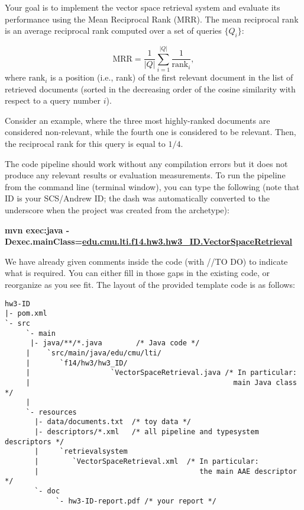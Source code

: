 \documentclass[oneside,11pt]{memoir}
\begin{document}
Your goal is to implement the vector space retrieval system
and evaluate its performance using the Mean Reciprocal Rank (MRR).  
The mean reciprocal rank is an average reciprocal rank
computed over a set of queries $\{Q_i\}$:

\begin{equation}\label{EqMRR}
\mbox{MRR} = \frac{1}{|Q|}\sum\limits_{i=1}^{|Q|} \frac{1} {\mbox{rank}_i},
\end{equation}
where $\mbox{rank}_i$ is a position (i.e., rank) of the first relevant document
in the list of retrieved documents (sorted in the decreasing order of the cosine similarity with respect to a query number $i$).

Consider an example, where the three most highly-ranked documents are considered 
non-relevant, while the fourth one is considered to be relevant. 
Then, the reciprocal rank for this query is equal to $1/4$.

The code pipeline should work without any compilation errors but it does not produce any relevant results or evaluation measurements.
To run the pipeline from the command line (terminal window), you can type the following
(note that ID is your SCS/Andrew ID; the dash was automatically converted to the underscore when the project was created from the archetype):

\begin{center}\small\textbf{mvn exec:java 
       -Dexec.mainClass=\url{edu.cmu.lti.f14.hw3.hw3_ID.VectorSpaceRetrieval}}\end{center}

We have already given comments inside the code (with //TO DO) to indicate what is required. 
You can either fill in those gaps in the existing code, or reorganize as you see fit.
The layout of the provided template code is as follows:

\hspace{-3em}
\begin{minipage}{0.9\textwidth}
\footnotesize
\begin{verbatim}
hw3-ID
|- pom.xml
`- src
     `- main
      |- java/**/*.java        /* Java code */
     |    `src/main/java/edu/cmu/lti/
     |       `f14/hw3/hw3_ID/
     |                   `VectorSpaceRetrieval.java /* In particular:
     |                                                main Java class */
     |                           
     `- resources
       |- data/documents.txt  /* toy data */ 
       |- descriptors/*.xml   /* all pipeline and typesystem descriptors */
       |     `retrievalsystem
       |        `VectorSpaceRetrieval.xml  /* In particular: 
       |                                      the main AAE descriptor */
       `- doc
            `- hw3-ID-report.pdf /* your report */

\end{verbatim}
\normalsize
\end{minipage}
\end{document}
